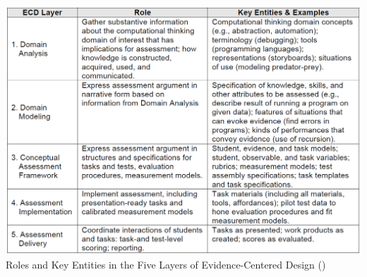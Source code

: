 \begin{table}
\includegraphics[scale=0.8]{figures/ECDoverview.png}
Roles and Key Entities in the Five Layers of Evidence-Centered Design (\cite{2014SnowBienkowski})
\end{table}\label{fig:ECD}




%
%
%



